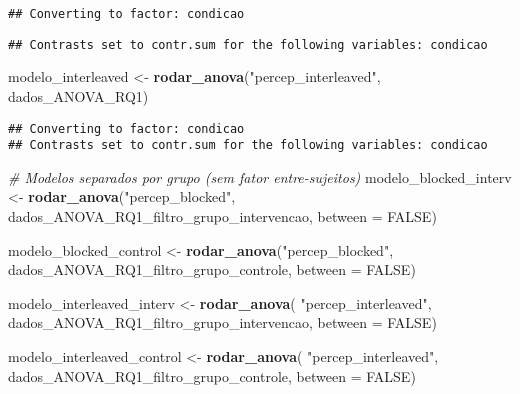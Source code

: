 \documentclass[
]{article}
\newenvironment{Shaded}{\begin{snugshade}}{\end{snugshade}}
\newcommand{\AttributeTok}[1]{\textcolor[rgb]{0.13,0.29,0.53}{#1}}
\newcommand{\CommentTok}[1]{\textcolor[rgb]{0.56,0.35,0.01}{\textit{#1}}}
\newcommand{\ConstantTok}[1]{\textcolor[rgb]{0.56,0.35,0.01}{#1}}
\newcommand{\FunctionTok}[1]{\textcolor[rgb]{0.13,0.29,0.53}{\textbf{#1}}}
\newcommand{\NormalTok}[1]{#1}
\newcommand{\OtherTok}[1]{\textcolor[rgb]{0.56,0.35,0.01}{#1}}
\newcommand{\StringTok}[1]{\textcolor[rgb]{0.31,0.60,0.02}{#1}}
\begin{document}
\begin{verbatim}
## Converting to factor: condicao
\end{verbatim}

\begin{verbatim}
## Contrasts set to contr.sum for the following variables: condicao
\end{verbatim}

\begin{Shaded}
\begin{Highlighting}[]
\NormalTok{modelo\_interleaved }\OtherTok{\textless{}{-}} \FunctionTok{rodar\_anova}\NormalTok{(}\StringTok{"percep\_interleaved"}\NormalTok{, dados\_ANOVA\_RQ1)}
\end{Highlighting}
\end{Shaded}

\begin{verbatim}
## Converting to factor: condicao
## Contrasts set to contr.sum for the following variables: condicao
\end{verbatim}

\begin{Shaded}
\begin{Highlighting}[]
\CommentTok{\# Modelos separados por grupo (sem fator entre{-}sujeitos)}
\NormalTok{modelo\_blocked\_interv }\OtherTok{\textless{}{-}} \FunctionTok{rodar\_anova}\NormalTok{(}\StringTok{"percep\_blocked"}\NormalTok{,}
\NormalTok{                                     dados\_ANOVA\_RQ1\_filtro\_grupo\_intervencao,}
                                     \AttributeTok{between =} \ConstantTok{FALSE}\NormalTok{)}

\NormalTok{modelo\_blocked\_control }\OtherTok{\textless{}{-}} \FunctionTok{rodar\_anova}\NormalTok{(}\StringTok{"percep\_blocked"}\NormalTok{,}
\NormalTok{                                      dados\_ANOVA\_RQ1\_filtro\_grupo\_controle,}
                                      \AttributeTok{between =} \ConstantTok{FALSE}\NormalTok{)}

\NormalTok{modelo\_interleaved\_interv }\OtherTok{\textless{}{-}} \FunctionTok{rodar\_anova}\NormalTok{(}
  \StringTok{"percep\_interleaved"}\NormalTok{,}
\NormalTok{  dados\_ANOVA\_RQ1\_filtro\_grupo\_intervencao,}
  \AttributeTok{between =} \ConstantTok{FALSE}\NormalTok{)}

\NormalTok{modelo\_interleaved\_control }\OtherTok{\textless{}{-}} \FunctionTok{rodar\_anova}\NormalTok{(}
  \StringTok{"percep\_interleaved"}\NormalTok{,}
\NormalTok{  dados\_ANOVA\_RQ1\_filtro\_grupo\_controle,}
  \AttributeTok{between =} \ConstantTok{FALSE}\NormalTok{)}
\end{Highlighting}
\end{Shaded}
\end{document}

